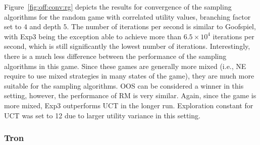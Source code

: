 Figure~\ref{fig:off:conv:rg} depicts the results for convergence of the sampling algorithms for the random game with correlated utility values, branching factor set to $4$ and depth $5$.
The number of iterations per second is similar to Goofspiel, with Exp3 being the exception able to achieve more than $6.5\times10^4$ iterations per second, which is still significantly the lowest number of iterations.
Interestingly, there is a much less difference between the performance of the sampling algorithms in this game.
Since these games are generally more mixed (i.e., NE require to use mixed strategies in many states of the game), they are much more suitable for the sampling algorithms.
OOS can be considered a winner in this setting, however, the performance of RM is very similar.
Again, since the game is more mixed, Exp3 outperforms UCT in the longer run.
Exploration constant for UCT was set to 12 due to larger utility variance in this setting.

\subsubsection{Tron}


